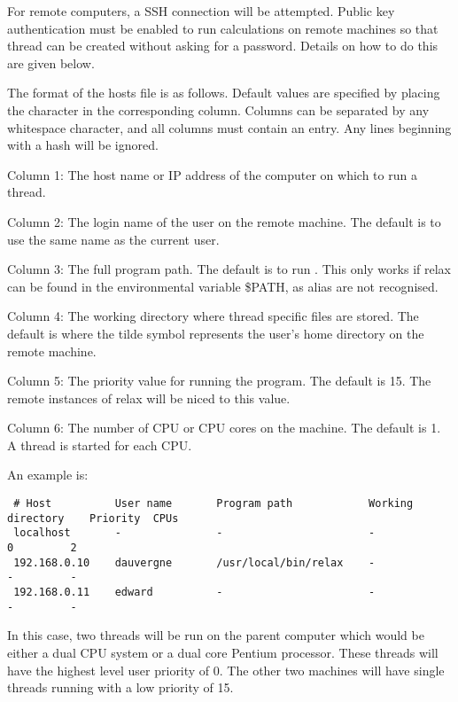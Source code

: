 For remote computers, a SSH connection will be attempted.  Public key authentication must be enabled to run calculations on remote machines so that thread can be created without asking for a password.  Details on how to do this are given below. 
  

 The format of the hosts file is as follows.  Default values are specified by placing the character \quotecmd{-} in the corresponding column.  Columns can be separated by any whitespace character, and all columns must contain an entry.  Any lines beginning with a hash will be ignored. 
  

 Column 1:  The host name or IP address of the computer on which to run a thread. 
  

 Column 2:  The login name of the user on the remote machine.  The default is to use the same name as the current user. 
  

 Column 3:  The full program path.  The default is to run .  This only works if relax can be found in the environmental variable \$PATH, as alias are not recognised. 
  

 Column 4:  The working directory where thread specific files are stored.  The default is  where the tilde \quotecmd{\~{}} symbol represents the user's home directory on the remote machine. 
  

 Column 5:  The priority value for running the program.  The default is 15.  The remote instances of relax will be niced to this value. 
  

 Column 6:  The number of CPU or CPU cores on the machine.  The default is 1.  A thread is started for each CPU. 
  

 An example is: 
  

 {\footnotesize \begin{verbatim} 
 # Host          User name       Program path            Working directory    Priority  CPUs 
 localhost       -               -                       -                    0         2 
 192.168.0.10    dauvergne       /usr/local/bin/relax    -                    -         - 
 192.168.0.11    edward          -                       -                    -         - 
 \end{verbatim}} 

 In this case, two threads will be run on the parent computer which would be either a dual CPU system or a dual core  Pentium processor.  These threads will have the highest level user priority of 0.  The other two machines will have single threads running with a low priority of 15. 
  

